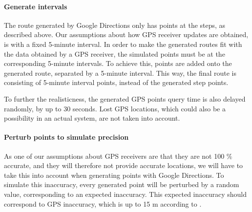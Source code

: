 \paragraph{Generate intervals} The route generated by Google Directions only has points at the steps, as described above.
Our assumptions about how GPS receiver updates are obtained, is with a fixed 5-minute interval.
In order to make the generated routes fit with the data obtained by a GPS receiver, the simulated points must be at the corresponding 5-minute intervals.
To achieve this, points are added onto the generated route, separated by a 5-minute interval.
This way, the final route is consisting of 5-minute interval points, instead of the generated step points.

To further the realisticness, the generated GPS points query time is also delayed randomly, by up to 30 seconds.
Lost GPS locations, which could also be a possibility in an actual system, are not taken into account.


\paragraph{Perturb points to simulate precision} As one of our assumptions about GPS receivers are that they are not 100 \% accurate, and they will therefore not provide accurate locations, we will have to take this into account when generating points with Google Directions.
To simulate this inaccuracy, every generated point will be perturbed by a random value, corresponding to an expected inaccuracy.
This expected inaccuracy should correspond to GPS inaccuracy, which is up to 15 m according to \citet{garmingps}.
